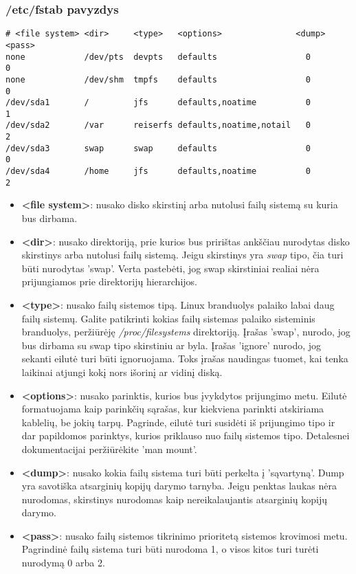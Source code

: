 \subsubsection{/etc/fstab pavyzdys}

\begin{verbatim}
# <file system> <dir>     <type>   <options>               <dump>    <pass>
none            /dev/pts  devpts   defaults                  0         0
none            /dev/shm  tmpfs    defaults                  0         0
/dev/sda1       /         jfs      defaults,noatime          0         1
/dev/sda2       /var      reiserfs defaults,noatime,notail   0         2
/dev/sda3       swap      swap     defaults                  0         0
/dev/sda4       /home     jfs      defaults,noatime          0         2
\end{verbatim}

\begin{itemize}
  \item \textbf{<file system>}: nusako disko skirstinį arba nutolusi
    failų sistemą su kuria bus dirbama. 
  \item \textbf{<dir>}: nusako direktoriją, prie kurios bus pririštas
    ankščiau nurodytas disko skirstinys arba nutolusi failų
    sistemą. Jeigu skirstinys yra \textsl{swap} tipo, čia turi būti
    nurodytas 'swap'. Verta pastebėti, jog swap skirstiniai realiai
    nėra prijungiamos prie direktorijų hierarchijos.
  \item \textbf{<type>}: nusako failų sistemos tipą. Linux branduolys
    palaiko labai daug failų sistemų. Galite patikrinti kokias failų
    sistemas palaiko sisteminis branduolys, peržiūrėję
    \textsl{/proc/filesystems} direktoriją. Įrašas 'swap', nurodo, jog
    bus dirbama su swap tipo skirstiniu ar byla. Įrašas 'ignore'
    nurodo, jog sekanti eilutė turi būti ignoruojama. Toks įrašas
    naudingas tuomet, kai tenka laikinai atjungi kokį nors išorinį ar
    vidinį diską.
  \item \textbf{<options>}: nusako parinktis, kurios bus įvykdytos
    prijungimo metu. Eilutė formatuojama kaip parinkčių sąrašas, kur
    kiekviena parinkti atskiriama kablelių, be jokių tarpų. Pagrinde,
    eilutė turi susidėti iš prijungimo tipo ir dar papildomos
    parinktys, kurios priklauso nuo failų sistemos tipo. Detalesnei
    dokumentacijai peržiūrėkite 'man mount'.
  \item \textbf{<dump>}: nusako kokia failų sistema turi būti perkelta
    į 'sąvartyną'. Dump yra savotiška atsarginių kopijų darymo
    tarnyba. Jeigu penktas laukas nėra nurodomas, skirstinys nurodomas
    kaip nereikalaujantis atsarginių kopijų darymo. 
  \item \textbf{<pass>}: nusako failų sistemos tikrinimo prioritetą
    sistemos krovimosi metu. Pagrindinė failų sistema turi būti
    nurodoma 1, o visos kitos turi turėti nurodymą 0 arba 2. 
\end{itemize}
